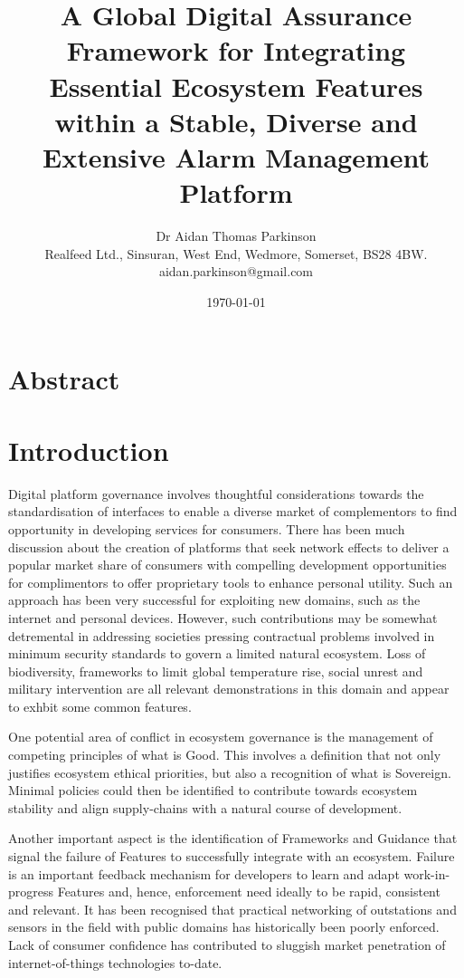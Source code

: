 \documentclass[11pt, oneside]{article}   	%
\title{A Global Digital Assurance Framework for Integrating Essential Ecosystem Features within a Stable, Diverse and Extensive Alarm Management Platform}
\author{Dr Aidan Thomas Parkinson\\ Realfeed Ltd., Sinsuran, West End, Wedmore, Somerset, BS28 4BW.\\ aidan.parkinson@gmail.com}
\date{\today}							%
\begin{document}
\maketitle

\section*{Abstract}

\pagebreak

\section{Introduction}
Digital platform governance involves thoughtful considerations towards the standardisation of interfaces to enable a diverse market of complementors to find opportunity in developing services for consumers.
There has been much discussion about the creation of platforms that seek network effects to deliver a popular market share of consumers with compelling development opportunities for complimentors to offer proprietary tools to enhance personal utility.
Such an approach has been very successful for exploiting new domains, such as the internet and personal devices.
However, such contributions may be somewhat detremental in addressing societies pressing contractual problems involved in minimum security standards to govern a limited natural ecosystem.
Loss of biodiversity, frameworks to limit global temperature rise, social unrest and military intervention are all relevant demonstrations in this domain and appear to exhbit some common features.

One potential area of conflict in ecosystem governance is the management of competing principles of what is Good.
This involves a definition that not only justifies ecosystem ethical priorities, but also a recognition of what is Sovereign.
Minimal policies could then be identified to contribute towards ecosystem stability and align supply-chains with a natural course of development.

Another important aspect is the identification of Frameworks and Guidance that signal the failure of Features to successfully integrate with an ecosystem.
Failure is an important feedback mechanism for developers to learn and adapt work-in-progress Features and, hence, enforcement need ideally to be rapid, consistent and relevant.
It has been recognised that practical networking of outstations and sensors in the field with public domains has historically been poorly enforced.
Lack of consumer confidence has contributed to sluggish market penetration of internet-of-things technologies to-date.
\end{document}
